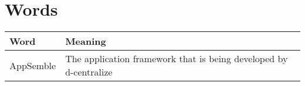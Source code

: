 \chapter{Words}
\begin{tabular}{|l|l|}
	\hline
	\textbf{Word} & \textbf{Meaning} \\
	\hline
	AppSemble & The application framework that is being developed by d-centralize \\ \hline
\end{tabular}